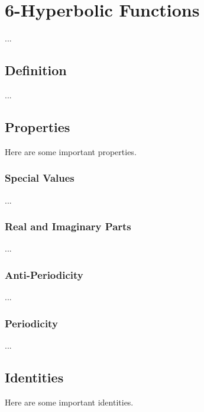 \chapter{6-Hyperbolic Functions}
...
\section{Definition}
...
\section{Properties}
Here are some important properties.
\subsection{Special Values}
...
\subsection{Real and Imaginary Parts}
...
\subsection{Anti-Periodicity}
...
\subsection{Periodicity}
...
\section{Identities}
Here are some important identities.
